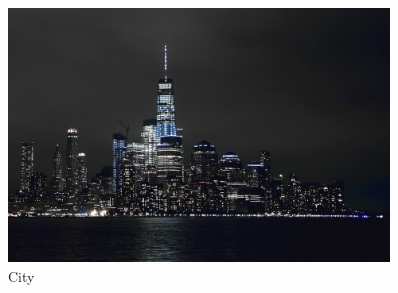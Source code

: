 \documentclass[]{article}
\begin{document}
\begin{figure}[H]
	\caption{City}\label{fig:city}
	\includegraphics[width=0.9\textwidth]{City}
\end{figure}
\end{document}
